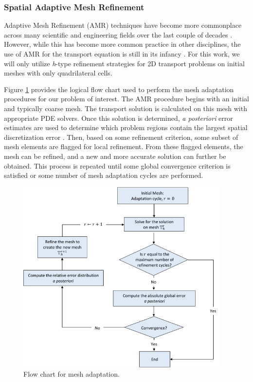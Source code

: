 \subsubsection{Spatial Adaptive Mesh Refinement}
\label{sec::Sn_Solution_Spatial_AMR}

Adaptive Mesh Refinement (AMR) techniques have become more commonplace across many scientific and engineering fields over the last couple of decades \cite{plewa2005adaptive,carey1997computational,ramm2003error,karniadakis2013spectral,schwab1998p,solin2003higher}. However, while this has become more common practice in other disciplines, the use of AMR for the transport equation is still in its infancy \cite{fuhrer1997posteriori,hartmann2002adaptive,dedner2002adaptive,hartmann2003adaptive,ragusa2010two,wang2011standard}. For this work, we will only utilize {\em h}-type refinement strategies for 2D transport problems on initial meshes with only quadrilateral cells. 

Figure \ref{fig::Sn_Solution_Spatial_AMR_flowchart} provides the logical flow chart used to perform the mesh adaptation procedures for our problem of interest. The AMR procedure begins with an initial and typically coarse mesh. The transport solution is calculated on this mesh with appropriate PDE solvers. Once this solution is determined, {\em a posteriori} error estimates are used to determine which problem regions contain the largest spatial discretization error \cite{verfurth1996review,ainsworth2011posteriori}. Then, based on some refinement criterion, some subset of mesh elements are flagged for local refinement. From these flagged elements, the mesh can be refined, and a new and more accurate solution can further be obtained. This process is repeated until some global convergence criterion is satisfied or some number of mesh adaptation cycles are performed.

\begin{figure}
\centering
\includegraphics[width=0.95\textwidth]{figures/sec_Sn/AMR_Flow_Chart.png}
\caption{Flow chart for mesh adaptation.}
\label{fig::Sn_Solution_Spatial_AMR_flowchart}
\end{figure}


